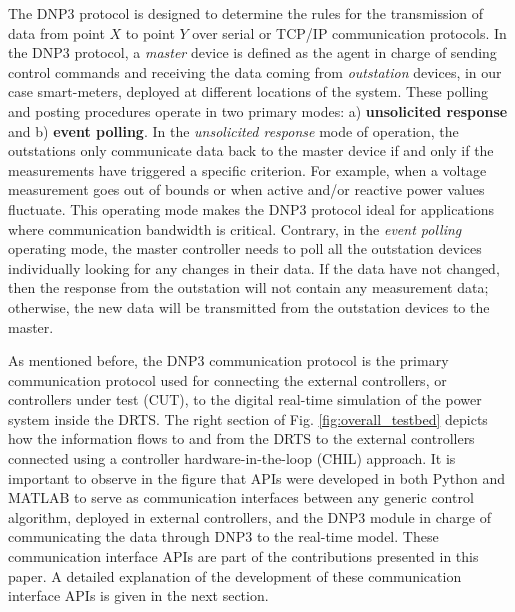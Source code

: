 The DNP3 protocol is designed to determine the rules for the transmission of data from point $X$ to point $Y$ over serial or TCP/IP communication protocols. In the DNP3 protocol, a \textit{master} device is defined as the agent in charge of sending control commands and receiving the data coming from \textit{outstation} devices, in our case smart-meters, deployed at different locations of the system. These polling and posting procedures operate in two primary modes: a) \textbf{unsolicited response} and b) \textbf{event polling}. In the \textit{unsolicited response} mode of operation, the outstations only communicate data back to the master device if and only if the measurements have triggered a specific criterion. For example, when a voltage measurement goes out of bounds or when active and/or reactive power values fluctuate. This operating mode makes the DNP3 protocol ideal for applications where communication bandwidth is critical. Contrary, in the \textit{event polling} operating mode, the master controller needs to poll all the outstation devices individually looking for any changes in their data. If the data have not changed, then the response from the outstation will not contain any measurement data; otherwise, the new data will be transmitted from the outstation devices to the master.

As mentioned before, the DNP3 communication protocol is the primary communication protocol used for connecting the external controllers, or controllers under test (CUT), to the digital real-time simulation of the power system inside the DRTS. The right section of Fig. \ref{fig:overall_testbed} depicts how the information flows to and from the DRTS to the external controllers connected using a controller hardware-in-the-loop (CHIL) approach. It is important to observe in the figure that APIs were developed in both Python and MATLAB to serve as communication interfaces between any generic control algorithm, deployed in external controllers, and the DNP3 module in charge of communicating the data through DNP3 to the real-time model. These communication interface APIs are part of the contributions presented in this paper. A detailed explanation of the development of these communication interface APIs is given in the next section.